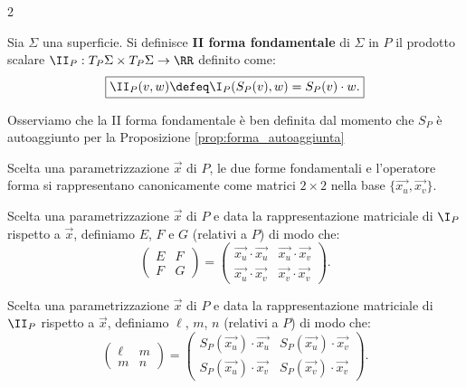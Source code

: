 \begin{multicols*}{2}
    \begin{definition}
        Sia $\Sigma$ una superficie. Si definisce \textbf{II forma fondamentale}
        di $\Sigma$ in $P$ il prodotto scalare $\II_P : T_P \Sigma \times T_P \Sigma \to \RR$
        definito come:
        \[
            \boxed{\II_P(v, w) \defeq \I_P(S_P(v), w) = S_P(v) \cdot w.}
        \]
    \end{definition}

    \begin{remark}
        Osserviamo che la II forma fondamentale è ben definita dal momento che
        $S_P$ è autoaggiunto per la Proposizione \ref{prop:forma_autoaggiunta}
    \end{remark}

    \begin{remark}
        Scelta una parametrizzazione $\vec{x}$ di $P$, le due forme fondamentali
        e l'operatore forma
        si rappresentano canonicamente come matrici $2 \times 2$ nella
        base $\{\vec{x_u}, \vec{x_v}\}$.
    \end{remark}

    \begin{definition}
        Scelta una parametrizzazione $\vec{x}$ di $P$ e data la rappresentazione
        matriciale di $\I_P$ rispetto a $\vec{x}$, definiamo $E$, $F$ e $G$ (relativi
        a $P$) di
        modo che:
        \[
            \begin{pmatrix}
                E & F \\
                F & G
            \end{pmatrix} =
            \begin{pmatrix}
                \vec{x_u} \cdot \vec{x_u} & \vec{x_u} \cdot \vec{x_v} \\
                \vec{x_u} \cdot \vec{x_v} & \vec{x_v} \cdot \vec{x_v}
            \end{pmatrix}.
        \]
    \end{definition}

    \begin{definition}
        Scelta una parametrizzazione $\vec{x}$ di $P$ e data la rappresentazione
        matriciale di $\II_P$ rispetto a $\vec{x}$, definiamo $\ell$, $m$, $n$ (relativi
        a $P$) di
        modo che:
        \[
            \begin{pmatrix}
                \ell & m \\
                m    & n
            \end{pmatrix} =
            \begin{pmatrix}
                S_P(\vec{x_u}) \cdot \vec{x_u} & S_P(\vec{x_u}) \cdot \vec{x_v} \\
                S_P(\vec{x_u}) \cdot \vec{x_v} & S_P(\vec{x_v}) \cdot \vec{x_v}
            \end{pmatrix}.
        \]
    \end{definition}


\end{multicols*}
